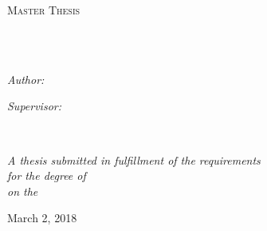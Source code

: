\documentclass[
11pt, %
english, %
singlespacing, %
]{MastersDoctoralThesis} %
\author{Benjamin \textsc{Winter}} %
\begin{document}
\frontmatter %

\pagestyle{plain} %


\begin{titlepage}
\begin{center}

\vspace*{.06\textheight}
{\scshape\LARGE \univname\par}\vspace{1.5cm} %
\textsc{\Large Master Thesis}\\[0.5cm] %

\HRule \\[0.4cm] %
{\huge \bfseries \ttitle\par}\vspace{0.4cm} %
\HRule \\[1.5cm] %
 
\begin{minipage}[t]{0.4\textwidth}
\begin{flushleft} \large
\emph{Author:}\\
\href{http://www.johnsmith.com}{\authorname} %
\end{flushleft}
\end{minipage}
\begin{minipage}[t]{0.4\textwidth}
\begin{flushright} \large
\emph{Supervisor:} \\
\href{http://www.jamessmith.com}{\supname} %
\end{flushright}
\end{minipage}\\[3cm]
 
\vfill

\large \textit{A thesis submitted in fulfillment of the requirements\\ for the degree of \degreename}\\[0.3cm] %
\textit{on the}\\[0.4cm]
\vfill

{\large March 2, 2018}\\[4cm] %
 
\vfill
\end{center}
\end{titlepage}
\end{document}
